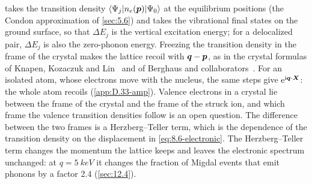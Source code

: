  takes the transition density $\langle\Psi_j|n_e(\bm{p})|\Psi_0\rangle$ at the equilibrium positions (the Condon approximation of \cref{sec:5.6}) and takes the vibrational final states on the ground surface, so that $\Delta E_j$ is the vertical excitation energy; for a delocalized pair, $\Delta E_j$ is also the zero-phonon energy. Freezing the transition density in the frame of the crystal makes the lattice recoil with $\bm{q} - \bm{p}$, as in the crystal formulas of Knapen, Kozaczuk and Lin~\cite[Eq.~(3)]{knapen2021migdal} and of Berghaus and collaborators~\cite[Eq.~(3.8)]{berghaus2023migdal}. For an isolated atom, whose electrons move with the nucleus, the same steps give $\mathrm{e}^{\mathrm{i}\bm{q}\cdot\bm{X}}$: the whole atom recoils (\cref{app:D.33-amp}). Valence electrons in a crystal lie between the frame of the crystal and the frame of the struck ion, and which frame the valence transition densities follow is an open question. The difference between the two frames is a Herzberg--Teller term, which is the dependence of the transition density on the displacement in \cref{eq:8.6-electronic}. The Herzberg--Teller term changes the momentum the lattice keeps and leaves the electronic spectrum unchanged: at $q = \SI{5}{keV}$ it changes the fraction of Migdal events that emit phonons by a factor 2.4 (\cref{sec:12.4}).

